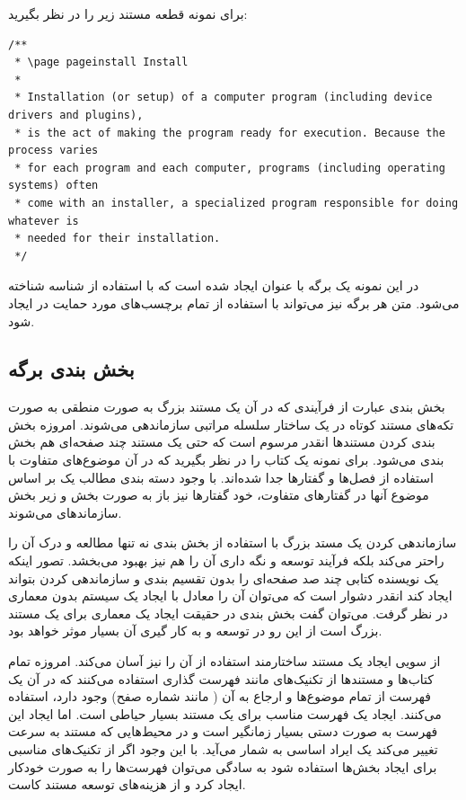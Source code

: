 برای نمونه قطعه مستند زیر را در نظر بگیرید:
\begin{latin}
\lstset{language=C++}  
\begin{lstlisting}[frame=single] 
/**
 * \page pageinstall Install
 * 
 * Installation (or setup) of a computer program (including device drivers and plugins),
 * is the act of making the program ready for execution. Because the process varies
 * for each program and each computer, programs (including operating systems) often
 * come with an installer, a specialized program responsible for doing whatever is
 * needed for their installation.
 */
\end{lstlisting}
\end{latin}

در این نمونه یک برگه با عنوان  ایجاد شده است که با استفاده از شناسه
 شناخته می‌شود. متن هر برگه نیز می‌تواند با استفاده از تمام
برچسب‌های مورد حمایت در  ایجاد شود.


\subsection{بخش بندی برگه}

بخش بندی عبارت از فرآیندی که در آن یک مستند بزرگ به صورت منطقی به صورت تکه‌های
مستند کوتاه در یک ساختار سلسله مراتبی سازماندهی می‌شوند. امروزه بخش بندی کردن
مستندها انقدر مرسوم است که حتی یک مستند چند صفحه‌ای هم بخش بندی می‌شود. برای
نمونه یک کتاب را در نظر بگیرید که در آن موضوع‌های متفاوت با استفاده از فصل‌ها و
گفتارها جدا شده‌اند. با وجود دسته بندی مطالب یک بر اساس موضوع آنها در گفتارهای
متفاوت، خود گفتارها نیز باز به صورت بخش و زیر بخش سازماندهای می‌شوند.

سازماندهی کردن یک مستد بزرگ با استفاده از بخش بندی نه تنها مطالعه و درک آن را
راحتر می‌کند بلکه فرآیند توسعه و نگه داری آن را هم نیز بهبود می‌بخشد. تصور اینکه
یک نویسنده کتابی چند صد صفحه‌ای را بدون تقسیم بندی و سازماندهی کردن بتواند ایجاد
کند انقدر دشوار است که می‌توان آن را معادل با ایجاد یک سیستم بدون معماری در نظر
گرفت. می‌توان گفت بخش بندی در حقیقت ایجاد یک معماری برای یک مستند بزرگ است از
این رو در توسعه و به کار گیری آن بسیار موثر خواهد بود.

از سویی ایجاد یک مستند ساختارمند استفاده از آن را نیز آسان می‌کند. امروزه تمام
کتاب‌ها و مستندها از تکنیک‌های مانند فهرست گذاری استفاده می‌کنند که در آن  یک
فهرست از تمام موضوع‌ها و ارجاع به آن ( مانند شماره صفح) وجود دارد، استفاده
می‌کنند. ایجاد یک فهرست مناسب برای یک مستند بسیار حیاطی است. اما ایجاد این فهرست
به صورت دستی بسیار زمانگیر است و در محیط‌هایی که مستند به سرعت تغییر می‌کند یک
ایراد اساسی به شمار می‌آید. با این وجود اگر از تکنیک‌های مناسبی برای ایجاد
بخش‌ها استفاده شود به سادگی می‌توان فهرست‌ها را به صورت خودکار ایجاد کرد و از
هزینه‌های توسعه مستند کاست.

